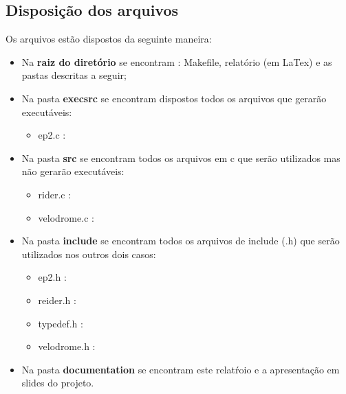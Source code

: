 \documentclass[12pt,a4paper]{article}
\begin{document}
\subsection{Disposição dos arquivos} 
	Os arquivos estão dispostos da seguinte maneira:
    \begin{itemize} %
    
    \item Na \textbf{raiz do diretório} se encontram : Makefile, relatório (em LaTex) e as pastas descritas a seguir;
    \item Na pasta \textbf{execsrc} se encontram dispostos todos os arquivos que gerarão executáveis:
    	
 	\begin{itemize} %
    \item ep2.c : %
 	\end{itemize} %
    
    \item Na pasta \textbf{src} se encontram todos os arquivos em c que serão utilizados mas não gerarão executáveis:
    
 	\begin{itemize} %
    \item rider.c : %
    \item velodrome.c : %
 	\end{itemize} %
    
    \item Na pasta \textbf{include} se encontram todos os arquivos de include (.h) que serão utilizados nos outros dois casos:
     
    \begin{itemize} %
    \item ep2.h : %
    \item reider.h : %
 	\item typedef.h : %
 	\item velodrome.h : %
 	\end{itemize} %
    
        \item Na pasta \textbf{documentation} se encontram este relatŕoio e a apresentação em slides do projeto.
    
    \end{itemize} %
    
\end{document}
